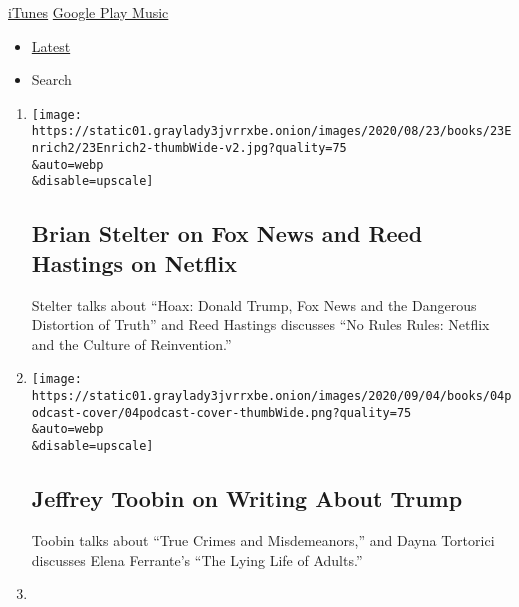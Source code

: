 \href{https://itunes.apple.com/us/podcast/book-review/id120315179?mt=2}{iTunes}
\textbar{}
\href{https://play.google.com/music/listen?u=0\#/ps/Iv6zeb5qwjtzjfbyo3vy5zny5ky}{Google
Play Music}

\begin{itemize}
\tightlist
\item
  \protect\hyperlink{stream-panel}{Latest}
\item
  Search
\end{itemize}

\begin{enumerate}
\def\labelenumi{\arabic{enumi}.}
\item
  \href{/2020/09/11/books/review/podcast-hoax-fox-news-donald-trump-brian-stelter-nextflix-reed-hastings.html}{}

  \texttt{[image: https://static01.graylady3jvrrxbe.onion/images/2020/08/23/books/23Enrich2/23Enrich2-thumbWide-v2.jpg?quality=75\\\&auto=webp\\\&disable=upscale]}

  \hypertarget{brian-stelter-on-fox-news-and-reed-hastings-on-netflix}{%
  \subsection{Brian Stelter on Fox News and Reed Hastings on
  Netflix}\label{brian-stelter-on-fox-news-and-reed-hastings-on-netflix}}

  Stelter talks about ``Hoax: Donald Trump, Fox News and the Dangerous
  Distortion of Truth'' and Reed Hastings discusses ``No Rules Rules:
  Netflix and the Culture of Reinvention.''
\item
  \href{/2020/09/04/books/review/podcast-jeffrey-toobin-true-crimes-misdemeanors-trump-dayna-tortorici-elena-ferrante.html}{}

  \texttt{[image: https://static01.graylady3jvrrxbe.onion/images/2020/09/04/books/04podcast-cover/04podcast-cover-thumbWide.png?quality=75\\\&auto=webp\\\&disable=upscale]}

  \hypertarget{jeffrey-toobin-on-writing-about-trump}{%
  \subsection{Jeffrey Toobin on Writing About
  Trump}\label{jeffrey-toobin-on-writing-about-trump}}

  Toobin talks about ``True Crimes and Misdemeanors,'' and Dayna
  Tortorici discusses Elena Ferrante's ``The Lying Life of Adults.''
\item
  \href{/2020/08/28/books/review/podcast-evil-geniuses-kurt-andersen-fallout-hiroshima-lesley-m-m-blume.html}{}


\end{enumerate}
